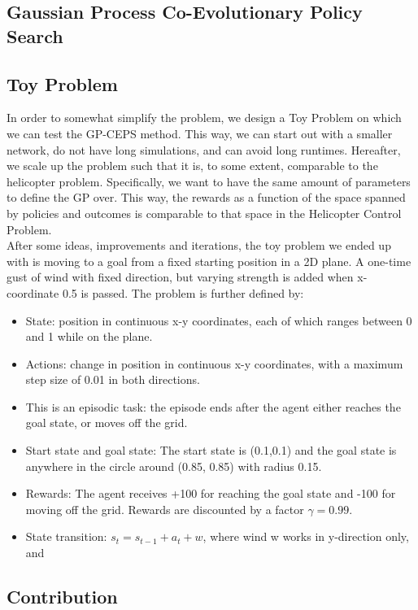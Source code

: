 \subsection{Gaussian Process Co-Evolutionary Policy Search}


\subsection{Toy Problem}

In order to somewhat simplify the problem, we design a Toy Problem on which we can test the GP-CEPS method. This way, we can start out with a smaller network, do not have long simulations, and can avoid long runtimes. Hereafter, we scale up the problem such that it is, to some extent, comparable to the helicopter problem. Specifically, we want to have the same amount of parameters to define the GP over. This way, the rewards as a function of the space spanned by policies and outcomes is comparable to that space in the Helicopter Control Problem.\\
After some ideas, improvements and iterations, the toy problem we ended up with is moving to a goal from a fixed starting position in a 2D plane. A one-time gust of wind with fixed direction, but varying strength is added when x-coordinate 0.5 is passed. The problem is further defined by:
\begin{itemize}

\item State: position in continuous x-y coordinates, each of which ranges between 0 and 1 while on the plane.
\item Actions: change in position in continuous x-y coordinates, with a maximum step size of 0.01 in both directions. 
\item This is an episodic task: the episode ends after the agent either reaches the goal state, or moves off the grid.
\item Start state and goal state: The start state is (0.1,0.1) and the goal state is anywhere in the circle around (0.85, 0.85) with radius 0.15.
\item Rewards: The agent receives +100 for reaching the goal state and -100 for moving off the grid. Rewards are discounted by a factor $\gamma =  0.99$.
\item State transition: $s_t = s_{t-1} + a_t + w$, where wind w works in y-direction only, and %
\end{itemize} 

\subsection{Contribution}
